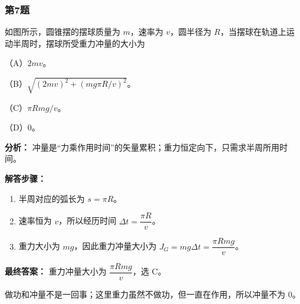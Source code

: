 \documentclass[12pt,a4paper]{ctexart}
\begin{document}
\subsubsection*{第7题}
\begin{tcolorbox}[colback=gray!2!white,colframe=black!60,title={题目}]
如图所示，圆锥摆的摆球质量为 \(m\)，速率为 \(v\)，圆半径为 \(R\)，当摆球在轨道上运动半周时，摆球所受重力冲量的大小为\par
（A）\(2mv\)。\par
（B）\(\sqrt{(2mv)^2+(mg\pi R/v)^2}\)。\par
（C）\(\pi Rmg/v\)。\par
（D）0。\par
\end{tcolorbox}
\begin{tcolorbox}[colback=blue!2!white,colframe=blue!55!black,title={完整答案}]
\textbf{分析：}
冲量是“力乘作用时间”的矢量累积；重力恒定向下，只需求半周所用时间。\par
\textbf{解答步骤：}
\begin{enumerate}
\item 半周对应的弧长为 \(s=\pi R\)。
\item 速率恒为 \(v\)，所以经历时间 \(\Delta t=\dfrac{\pi R}{v}\)。
\item 重力大小为 \(mg\)，因此重力冲量大小为 \(J_G=mg\Delta t=\dfrac{\pi Rmg}{v}\)。
\end{enumerate}
\textbf{最终答案：}
重力冲量大小为 \(\dfrac{\pi Rmg}{v}\)，选 C。\par
\end{tcolorbox}
\begin{tcolorbox}[colback=red!2!white,colframe=red!55!black,title={易错点}]
做功和冲量不是一回事；这里重力虽然不做功，但一直在作用，所以冲量不为 0。\par
\end{tcolorbox}
\end{document}
